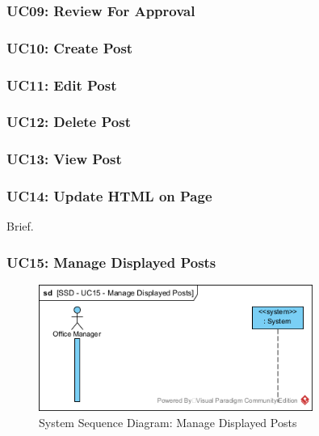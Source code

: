 \documentclass{article}
\begin{document}
\subsubsection{UC09: Review For Approval}

\subsubsection{UC10: Create Post}

\subsubsection{UC11: Edit Post}

\subsubsection{UC12: Delete Post}

\subsubsection{UC13: View Post}

\subsubsection{UC14: Update HTML on Page}
Brief.
\subsubsection{UC15: Manage Displayed Posts}
\begin{figure}[H]
    \centering
    \includegraphics[width=0.8\textwidth]{images/SSD-UC15-ManageDisplayedPosts.png}
    \centering
    \caption{System Sequence Diagram: Manage Displayed Posts}
\end{figure}
\end{document}
